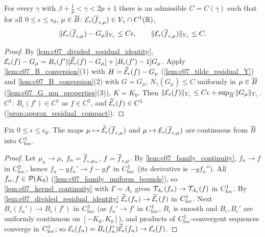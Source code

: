 \begin{lemma}
  \label{lem:c07_residual_Y}
  For every $\gamma$ with $\beta+\frac1p<\gamma<2p+1$ there is an admissible $C=C(\gamma)$ such that for all
  $0\le\epsilon\le\epsilon_0$, $\mu\in\overline{B}$: $\mathcal{E}_\epsilon(\overline{f}_{\epsilon,\mu})\in Y_\gamma\cap C^1(\mathbb{R})$,
  \[
    \|\mathcal{E}_\epsilon(\overline{f}_{\epsilon,\mu})-G_\mu\|_{Y_\gamma}\le C\epsilon,\qquad
    \|\mathcal{E}_\epsilon(\overline{f}_{\epsilon,\mu})\|_{Y_\gamma}\le C .
  \]
\end{lemma}
\begin{proof}
  By \cref{lem:c07_divided_residual_identity},
  $\mathcal{E}_\epsilon(f)-G_\mu=B_\epsilon(f')[\widetilde{\mathcal{E}}_\epsilon(f)-G_\mu]+[B_\epsilon(f')-1]G_\mu$. Apply
  \cref{lem:c07_B_conversion}(1) with $H=\widetilde{\mathcal{E}}_\epsilon(f)-G_\mu$ (\cref{lem:c07_tilde_residual_Y}) and
  \cref{lem:c07_B_conversion}(2) with $G=G_\mu$, $N_\gamma(G_\mu)\le C$ uniformly in $\mu\in\overline{B}$
  (\cref{lem:c07_G_mu_properties}(3)), $K=K_0$. Then $\|\mathcal{E}_\epsilon(f)\|_{Y_\gamma}\le C\epsilon+\sup_{\overline{B}}\|G_\mu\|_{Y_\gamma}$.
  $C^1$: $B_\epsilon(f')\in C^1$ as $f\in C^2$, and $\widetilde{\mathcal{E}}_\epsilon(f)\in C^1$ (\cref{prop:approx_residual_compact}).
\end{proof}

\begin{lemma}
  \label{lem:c07_residual_continuity_C1loc}
  Fix $0\le\epsilon\le\epsilon_0$. The maps $\mu\mapsto\widetilde{\mathcal{E}}_\epsilon(\overline{f}_{\epsilon,\mu})$ and
  $\mu\mapsto\mathcal{E}_\epsilon(\overline{f}_{\epsilon,\mu})$ are continuous from $\overline{B}$ into $C^1_{\textup{loc}}$.
\end{lemma}
\begin{proof}
  Let $\mu_n\to\mu$, $f_n=\overline{f}_{\epsilon,\mu_n}$, $f=\overline{f}_{\epsilon,\mu}$. By \cref{lem:c07_family_continuity},
  $f_n\to f$ in $C^2_{\textup{loc}}$, hence $f_n-yf_n'\to f-yf'$ in $C^1_{\textup{loc}}$ (its derivative is $-yf_n''$).
  All $f_n,f\in\mathcal{P}(K_0)$ (\cref{lem:c07_family_uniform_bounds}), so \cref{lem:c07_kernel_continuity} with
  $\Gamma=A_\epsilon$ gives $\mathcal{T}_{A_\epsilon}(f_n)\to\mathcal{T}_{A_\epsilon}(f)$ in $C^1_{\textup{loc}}$. By
  \cref{lem:c07_divided_residual_identity} $\widetilde{\mathcal{E}}_\epsilon(f_n)\to\widetilde{\mathcal{E}}_\epsilon(f)$ in $C^1_{\textup{loc}}$. Next
  $B_\epsilon(f_n')\to B_\epsilon(f')$ in $C^1_{\textup{loc}}$ (as $f_n'\to f'$ in $C^1_{\textup{loc}}$, $B_\epsilon$ is smooth and
  $B_\epsilon,B_\epsilon'$ are uniformly continuous on $[-K_0,K_0]$), and products of $C^1_{\textup{loc}}$-convergent
  sequences converge in $C^1_{\textup{loc}}$; so $\mathcal{E}_\epsilon(f_n)=B_\epsilon(f_n')\widetilde{\mathcal{E}}_\epsilon(f_n)\to\mathcal{E}_\epsilon(f)$.
\end{proof}

